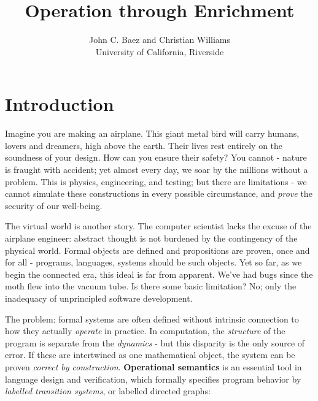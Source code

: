 \documentclass[a4paper,UKenglish]{article}
\theoremstyle{definition}
\begin{document}
\title{Operation through Enrichment}
\author{John C. Baez and Christian Williams\\University of California, Riverside}

\maketitle

\section{Introduction}

Imagine you are making an airplane. This giant metal bird will carry humans, lovers and dreamers, high above the earth. Their lives rest entirely on the soundness of your design. How can you ensure their safety? You cannot - nature is fraught with accident; yet almost every day, we soar by the millions without a problem. This is physics, engineering, and testing; but there are limitations - we cannot simulate these constructions in every possible circumstance, and \textit{prove} the security of our well-being.

The virtual world is another story. The computer scientist lacks the excuse of the airplane engineer: abstract thought is not burdened by the contingency of the physical world. Formal objects are defined and propositions are proven, once and for all - programs, languages, systems should be such objects. Yet so far, as we begin the connected era, this ideal is far from apparent. We've had bugs since the moth flew into the vacuum tube. Is there some basic limitation? No; only the inadequacy of unprincipled software development.

The problem: formal systems are often defined without intrinsic connection to how they actually \textit{operate} in practice. In computation, the \textit{structure} of the program is separate from the \textit{dynamics} - but this disparity is the only source of error. If these are intertwined as one mathematical object, the system can be proven \textit{correct by construction}. \textbf{Operational semantics} \cite{sos} is an essential tool in language design and verification, which formally specifies program behavior by \textit{labelled transition systems}, or labelled directed graphs:
\begin{center}\end{center}
\end{document}
